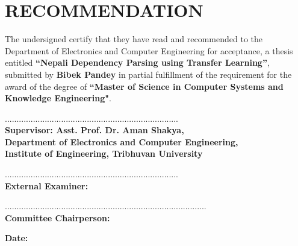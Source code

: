 \chapter*{RECOMMENDATION}
The undersigned certify that they have read and recommended to the Department of
Electronics and Computer Engineering for acceptance, a thesis entitled \textbf{``Nepali Dependency Parsing using Transfer Learning''}, submitted by \textbf{Bibek Pandey} in partial fulfillment of the requirement for
the award of the degree of \textbf{``Master of Science in Computer Systems and Knowledge Engineering"}.\par
\vspace{1.5cm}
..........................................................................\\
\textbf{Supervisor: Asst. Prof. Dr. Aman Shakya,\\Department of Electronics and Computer Engineering,\\Institute of Engineering, Tribhuvan University}\par
\vspace{1.5cm}
..........................................................................\\
\textbf{External Examiner:  }

\vspace{1.5cm}
......................................................................................\\
\textbf{Committee Chairperson:  }

\vspace{0.8cm}
\textbf{Date: }

\newpage
